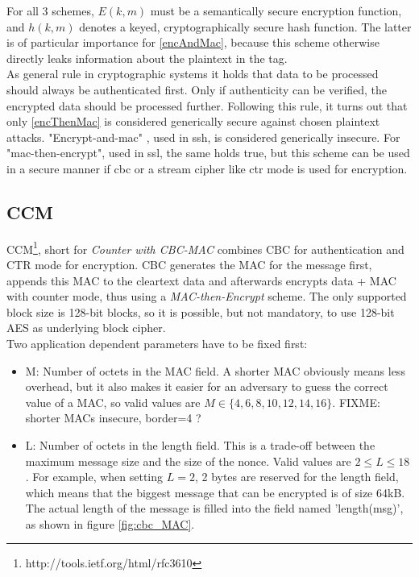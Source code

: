 For all 3 schemes, $E(k, m)$ must be a semantically secure encryption function, and $h(k, m)$ denotes a keyed, cryptographically secure hash function.
The latter is of particular importance for \ref{encAndMac}, because this scheme otherwise directly leaks information about the plaintext in the tag. 
\\
As general rule in cryptographic systems it holds that data to be processed should always be authenticated first. Only if authenticity can be verified,
the encrypted data should be processed further.
Following this rule, it turns out that only \ref{encThenMac} is considered generically secure against chosen plaintext attacks.
"Encrypt-and-mac" \cite{sshBellare}, used in \gls{ssh}, is considered generically
insecure. For "mac-then-encrypt", used in \gls{ssl}, the same holds true, but this scheme can be used in a secure manner if \gls{cbc} or a stream cipher like 
\gls{ctr} mode is used for encryption.

\subsection{CCM}

CCM\footnote{http://tools.ietf.org/html/rfc3610}, short for \textit{Counter with CBC-MAC} combines CBC for authentication and CTR mode for encryption.
CBC generates the MAC for the message first, appends this MAC to the cleartext data and afterwards encrypts data + MAC with counter mode, thus using a
\textit{MAC-then-Encrypt} scheme. The only
supported block size is 128-bit blocks, so it is possible, but not mandatory, to use 128-bit AES as underlying block cipher.
\\
Two application dependent parameters have to be fixed first: 
\begin{itemize}
 \item M: Number of octets in the MAC field. A shorter MAC obviously means less overhead, but it also makes it easier for an adversary to guess the correct
 value of a MAC, so valid values are $M \in \{4, 6, 8, 10, 12, 14, 16\}$. FIXME: shorter MACs insecure, border=4 ? 
 \item L: Number of octets in the length field. This is a trade-off between the maximum message size and the size of the nonce. Valid values are $2 \leq L \leq 18$.
 For example, when setting $L = 2$, 2 bytes are reserved for the length field, which means that the biggest message that can be encrypted is of size 64kB. The actual
 length of the message is filled into the field named 'length(msg)', as shown in figure \ref{fig:cbc_MAC}.
\end{itemize}

